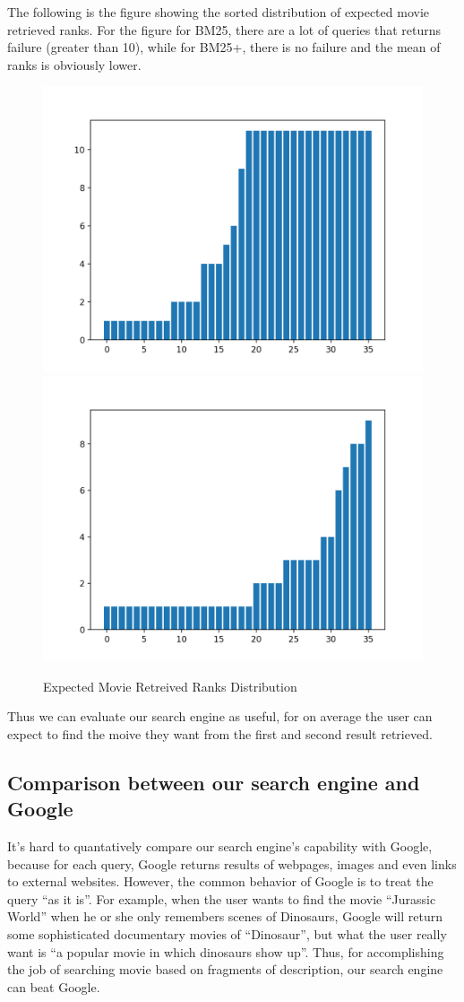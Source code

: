 \documentclass[sigconf,nonacm]{acmart}
\begin{document}
The following is the figure showing the sorted distribution of expected movie retrieved ranks.
For the figure for BM25, there are a lot of queries that returns failure (greater than 10),
while for BM25+, there is no failure and the mean of ranks is obviously lower.


\begin{figure}[H]
  \includegraphics[width=0.47\linewidth]{evaluation_1.png}
  \includegraphics[width=0.47\linewidth]{evaluation_2.png}
  \caption{Expected Movie Retreived Ranks Distribution}
\end{figure}

Thus we can evaluate our search engine as useful, for on average the user
can expect to find the moive they want from the first and second result
retrieved.

\subsection{Comparison between our search engine and Google}

It's hard to quantatively compare our search engine's capability with
Google, because for each query, Google returns results of webpages, images
and even links to external websites.
However, the common behavior of Google is to treat the query ``as it is''.
For example, when the user wants to find the movie ``Jurassic World'' when he or she only remembers
scenes of Dinosaurs, Google will return some sophisticated documentary
movies of ``Dinosaur'', but what the user really want is ``a popular movie in
which dinosaurs show up''.
Thus, for accomplishing the job of searching movie based on fragments of description, our search engine
can beat Google.
\end{document}
